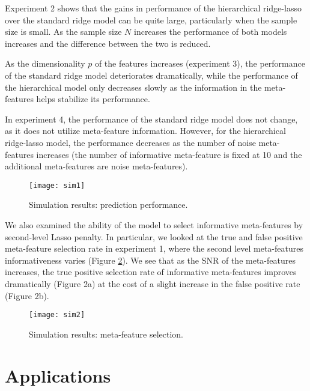 Experiment 2 shows that the gains in performance of the hierarchical ridge-lasso over the standard ridge model can be quite large, particularly when the sample size is small. As the sample size $N$ increases the performance of both models increases and the difference between the two is reduced. 

As the dimensionality $p$ of the features increases (experiment 3), the performance of the standard ridge model deteriorates dramatically, while the performance of the hierarchical model only decreases slowly as the information in the meta-features helps stabilize its performance.

In experiment 4, the performance of the standard ridge model does not change, as it does not utilize meta-feature information. However, for the hierarchical ridge-lasso model, the performance decreases as the number of noise meta-features increases (the number of informative meta-feature is fixed at 10 and the additional meta-features are noise meta-features).  
\begin{figure}[tbh]
  \centering
  \texttt{[image: sim1]}
  \caption[Simulation results: prediction performance]{
    Simulation results: prediction performance.
  }
  \label{fig:sim1}
\end{figure}

We also examined the ability of the model to select informative meta-features by second-level Lasso penalty. In particular, we looked at the true and false positive meta-feature selection rate in experiment 1, where the second level meta-features informativeness varies (Figure \ref{fig:sim2}). We see that as the SNR of the meta-features increases, the true positive selection rate of informative meta-features improves dramatically (Figure 2a) at the cost of a slight increase in the false positive rate (Figure 2b).  
\begin{figure}[tbh]
  \centering
  \texttt{[image: sim2]}
  \caption[Simulation results: meta-feature selection]{
    Simulation results: meta-feature selection.
  }
  \label{fig:sim2}
\end{figure}

\section{Applications}
